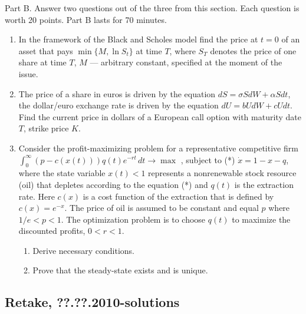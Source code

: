 \documentclass[12pt, a4paper]{article}
\begin{document}
Part B.
Answer two questions out of the three from this section. Each question is worth 20 points.
Part B lasts for 70 minutes.

\begin{enumerate}[resume]
\item In the framework of the Black and Scholes model find the price at $t=0$  of an asset that pays $\min\{M,\ln S_t\}$  at time $T$, where $S_T$ denotes the price of one share at time $T$,  $M$ — arbitrary constant, specified at the moment of the issue.

\item The price of a share in euros is driven by the equation $dS=\sigma S dW+\alpha S dt$, the dollar/euro exchange rate is driven by the equation $dU=b U dW+c U dt$. Find the current price in dollars of a European call option with maturity date $T$, strike price $K$.

\item Consider the profit-maximizing problem for a representative competitive firm
$\int_0^{\infty} (p-c(x(t)))q(t)e^{-rt}\,dt \to \max$
, subject to (*) $\dot{x}=1-x-q$, where the state variable $x(t)<1$ represents a nonrenewable stock resource (oil) that depletes according to the equation (*) and $q(t)$ is the extraction rate. Here $c(x)$ is a cost function of the extraction that is defined by $c(x)=e^{-x}$. The price of oil is assumed to be constant and equal $p$ where $1/e<p<1$.  The optimization problem is to choose $q(t)$ to maximize the discounted profits, $0<r<1$.
\begin{enumerate}
\item Derive necessary conditions.
\item Prove that the steady-state exists and is unique.
\end{enumerate}

\end{enumerate}

\subsection{Retake, ??.??.2010-solutions}
\end{document}
